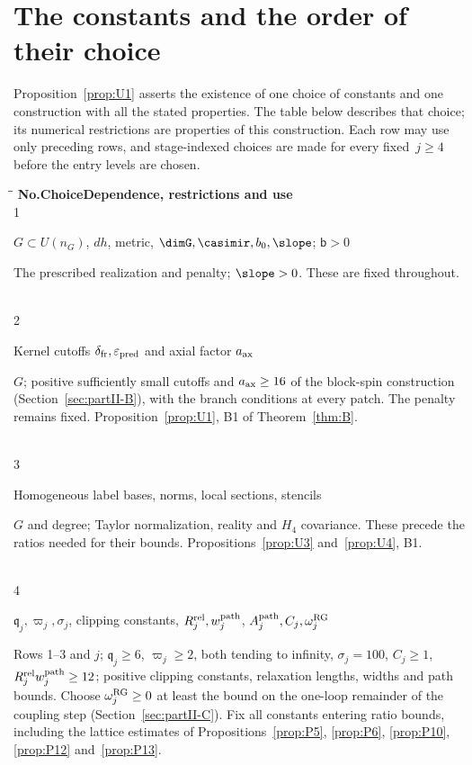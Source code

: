 \section{The constants and the order of their choice}\label{sec:constants}

Proposition~\ref{prop:U1} asserts the existence of one choice of constants and one construction with all the stated properties. The table below describes that choice; its numerical restrictions are properties of this construction. Each row may use only preceding rows, and stage-indexed choices are made for every fixed~$j\ge4$ before the entry levels are chosen.

\label{tab:constant-choices}
\begingroup
\begin{tabbing}
\hspace{2.4em}\=\hspace{0.27\linewidth}\=\kill
\textbf{No.}\>\textbf{Choice}\>\textbf{Dependence, restrictions and use}\\[0.4em]
1\>\parbox[t]{0.26\linewidth}{\raggedright $G\subset U(n_G)$, $dh$, metric, $\dimG,\casimir,b_0,\slope$; $\mathsf b>0$}\>\parbox[t]{0.67\linewidth}{\raggedright The prescribed realization and penalty; $\slope>0$. These are fixed throughout.}\\[0.45em]
2\>\parbox[t]{0.26\linewidth}{\raggedright Kernel cutoffs $\delta_{\rm fr},\varepsilon_{\rm pred}$ and axial factor $a_{\rm ax}$}\>\parbox[t]{0.67\linewidth}{\raggedright $G$; positive sufficiently small cutoffs and $a_{\rm ax}\ge16$ of the block-spin construction (Section~\ref{sec:partII-B}), with the branch conditions at every patch. The penalty remains fixed. Proposition~\ref{prop:U1}, B1 of Theorem~\ref{thm:B}.}\\[0.45em]
3\>\parbox[t]{0.26\linewidth}{\raggedright Homogeneous label bases, norms, local sections, stencils}\>\parbox[t]{0.67\linewidth}{\raggedright $G$ and degree; Taylor normalization, reality and $H_4$ covariance. These precede the ratios needed for their bounds. Propositions~\ref{prop:U3} and~\ref{prop:U4}, B1.}\\[0.45em]
4\>\parbox[t]{0.26\linewidth}{\raggedright $\mathfrak q_j,\varpi_j,\sigma_j$, clipping constants, $R_j^{\rm rel},w_j^{\rm path}$, $A_j^{\rm path},C_j,\omega_j^{\rm RG}$}\>\parbox[t]{0.67\linewidth}{\raggedright Rows 1--3 and $j$; $\mathfrak q_j\ge6$, $\varpi_j\ge2$, both tending to infinity, $\sigma_j=100$, $C_j\ge1$, $R_j^{\rm rel}w_j^{\rm path}\ge12$; positive clipping constants, relaxation lengths, widths and path bounds. Choose $\omega_j^{\rm RG}\ge0$ at least the bound on the one-loop remainder of the coupling step (Section~\ref{sec:partII-C}). Fix all constants entering ratio bounds, including the lattice estimates of Propositions~\ref{prop:P5}, \ref{prop:P6}, \ref{prop:P10}, \ref{prop:P12} and~\ref{prop:P13}.}\\[0.45em]

\end{tabbing}
